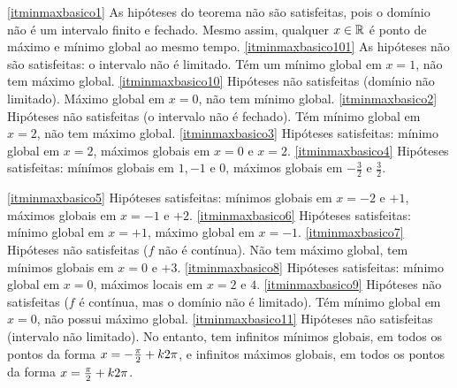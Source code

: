 \begin{Solution}{7.1}
\eqref{itminmaxbasico1} As hipóteses do teorema não são satisfeitas, pois o
domínio não é um intervalo finito e fechado. Mesmo assim, qualquer $x\in \mathbb{R}$ é
ponto de máximo e mínimo global ao mesmo tempo.
\eqref{itminmaxbasico101} As hipóteses não são satisfeitas: o intervalo
não é limitado. Tém um
mínimo global em $x=1$, não tem máximo global.
\eqref{itminmaxbasico10} Hipóteses não satisfeitas (domínio não limitado).
Máximo global em $x=0$, não tem mínimo global.
\eqref{itminmaxbasico2} Hipóteses não satisfeitas (o intervalo não é fechado).
Tém mínimo global em $x=2$, não tem máximo global.
\eqref{itminmaxbasico3} Hipóteses satisfeitas: mínimo global em $x=2$, máximos
globais em $x=0$ e $x=2$.
\eqref{itminmaxbasico4} Hipóteses satisfeitas:
mínímos globais em $1,-1$ e $0$, máximos globais em
$-\tfrac32$ e $\tfrac32$.
\begin{center}
\begin{bmlimage}\end{bmlimage}
\end{center}
\eqref{itminmaxbasico5} Hipóteses satisfeitas: mínimos globais em $x=-2$ e
$+1$, máximos globais em $x=-1$ e $+2$.
\eqref{itminmaxbasico6} Hipóteses satisfeitas: mínimo global em $x=+1$, máximo
global em $x=-1$.
\eqref{itminmaxbasico7} Hipóteses não satisfeitas ($f$ não é contínua). Não tem
máximo global, tem mínimos globais em $x=0$ e $+3$.
\eqref{itminmaxbasico8} Hipóteses satisfeitas: mínimo global em $x=0$, máximos
locais em $x=2$ e $4$.
\eqref{itminmaxbasico9} Hipóteses não satisfeitas ($f$ é contínua, mas o
domínio não é limitado). Tém mínimo global em $x=0$, não possui máximo global.
\eqref{itminmaxbasico11} Hipóteses não satisfeitas (intervalo não
limitado). No entanto, tem infinitos mínimos
globais, em todos os pontos da forma $x=-\tfrac{\pi}{2}+k2\pi$, e infinitos
máximos globais, em todos os pontos da forma $x=\tfrac{\pi}{2}+k2\pi$.
\end{Solution}
